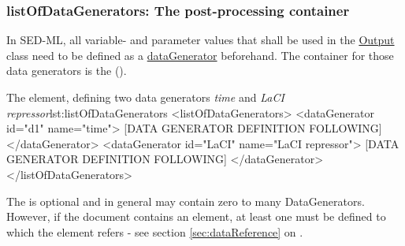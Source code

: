  \subsubsection{listOfDataGenerators: The post-processing container}
\label{sec:listOfDataGenerators}

In SED-ML, all variable- and parameter values that shall be used in the \hyperref[class:output]{Output} class need to be defined as a \hyperref[class:dataGenerator]{dataGenerator} beforehand. The container for those data generators is the  (). 
%

%
\begin{myXmlLst}{The  element, defining two data generators \emph{time} and \emph{LaCI repressor}}{lst:listOfDataGenerators}
<listOfDataGenerators>
 <dataGenerator id="d1" name="time">
  [DATA GENERATOR DEFINITION FOLLOWING]
 </dataGenerator>
 <dataGenerator id="LaCI" name="LaCI repressor">
  [DATA GENERATOR DEFINITION FOLLOWING]
 </dataGenerator>
</listOfDataGenerators>
\end{myXmlLst}

The  is optional and in general may contain zero to many DataGenerators. However, if the \currentLV document contains  an    element, at least one   must be defined to which the  element refers -  see  section \ref{sec:dataReference} on .
%



